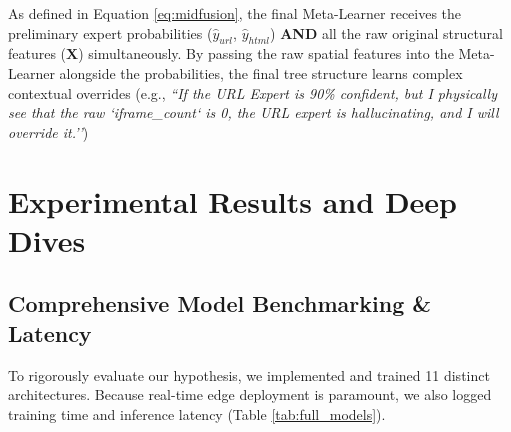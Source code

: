 \documentclass[conference]{IEEEtran}
\begin{document}
As defined in Equation \eqref{eq:midfusion}, the final Meta-Learner receives the preliminary expert probabilities ($\hat{y}_{url}$, $\hat{y}_{html}$) \textbf{AND} all the raw original structural features ($\mathbf{X}$) simultaneously. By passing the raw spatial features into the Meta-Learner alongside the probabilities, the final tree structure learns complex contextual overrides (e.g., \textit{``If the URL Expert is 90\% confident, but I physically see that the raw `iframe\_count` is 0, the URL expert is hallucinating, and I will override it.''})

\section{Experimental Results and Deep Dives}

\subsection{Comprehensive Model Benchmarking \& Latency}
To rigorously evaluate our hypothesis, we implemented and trained 11 distinct architectures. Because real-time edge deployment is paramount, we also logged training time and inference latency (Table \ref{tab:full_models}).
\end{document}
